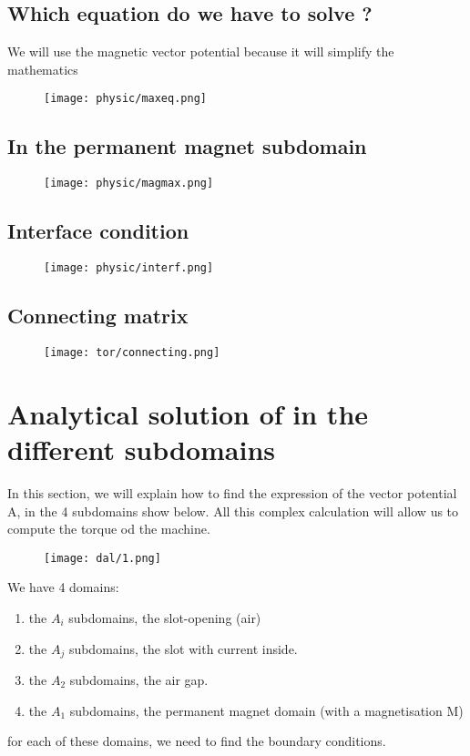 \subsection{Which equation do we have to solve ?}
We will use the magnetic vector potential because it will simplify the mathematics
\begin{figure}[H]
    \centering
    \texttt{[image: physic/maxeq.png]}
\end{figure}

\subsection{In the permanent magnet subdomain}
\begin{figure}[H]
    \centering
    \texttt{[image: physic/magmax.png]}
\end{figure}


\subsection{Interface condition}
\begin{figure}[H]
    \centering
    \texttt{[image: physic/interf.png]}
\end{figure}

\subsection{Connecting matrix}
\begin{figure}[H]
    \centering
    \texttt{[image: tor/connecting.png]}
\end{figure}


\section{Analytical solution of in the different subdomains}

In this section, we will explain how to find the expression of the vector potential A, in the 4 subdomains show below. All this complex calculation will allow us to compute the torque od the machine.

\begin{figure}[H]
    \centering
    \texttt{[image: dal/1.png]}
\end{figure}

We have 4 domains:
\begin{enumerate}
    \item the $A_i$ subdomains, the slot-opening (air)
    \item the $A_j$ subdomains, the slot with current inside.
    \item the $A_2$ subdomains, the air gap.
    \item the $A_1$ subdomains, the permanent magnet domain (with a magnetisation M)
\end{enumerate}
for each of these domains, we need to find the boundary conditions.

